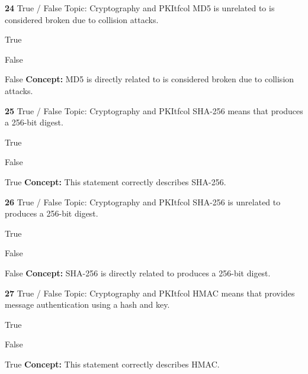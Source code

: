 \documentclass[10pt,a4paper]{article}
\begin{document}
\begin{qcard}{\color{white}\textbf{24} \hfill \small True / False \textbar{} Topic: Cryptography and PKI}{tfcol}
MD5 is unrelated to is considered broken due to collision attacks.

\begin{qoptions}
\item True
\item False
\end{qoptions}
\begin{explainbox}{False}
\textbf{Concept:} MD5 is directly related to is considered broken due to collision attacks.
\end{explainbox}
\end{qcard}

\begin{qcard}{\color{white}\textbf{25} \hfill \small True / False \textbar{} Topic: Cryptography and PKI}{tfcol}
SHA-256 means that produces a 256-bit digest.

\begin{qoptions}
\item True
\item False
\end{qoptions}
\begin{explainbox}{True}
\textbf{Concept:} This statement correctly describes SHA-256.
\end{explainbox}
\end{qcard}

\begin{qcard}{\color{white}\textbf{26} \hfill \small True / False \textbar{} Topic: Cryptography and PKI}{tfcol}
SHA-256 is unrelated to produces a 256-bit digest.

\begin{qoptions}
\item True
\item False
\end{qoptions}
\begin{explainbox}{False}
\textbf{Concept:} SHA-256 is directly related to produces a 256-bit digest.
\end{explainbox}
\end{qcard}

\begin{qcard}{\color{white}\textbf{27} \hfill \small True / False \textbar{} Topic: Cryptography and PKI}{tfcol}
HMAC means that provides message authentication using a hash and key.

\begin{qoptions}
\item True
\item False
\end{qoptions}
\begin{explainbox}{True}
\textbf{Concept:} This statement correctly describes HMAC.
\end{explainbox}
\end{qcard}
\end{document}
